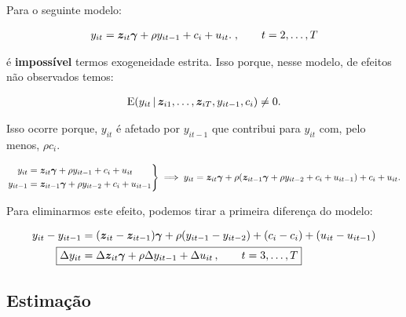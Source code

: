 \documentclass[11pt, oneside, a4paper, article]{article}
\numberwithin{equation}{section}
\begin{document}
\begin{description}
	Para o seguinte modelo:

	\vspace{-1.5 em}
	\begin{align*}
		y_{it} = \boldsymbol{z}_{it} \boldsymbol{\gamma} + \rho y_{i t - 1} + c_{i} + u_{it}.
		\; , \qquad t = 2, \dots, T
	\end{align*}

	\noindent
	é \textbf{impossível} termos exogeneidade estrita.
	Isso porque, nesse modelo, de efeitos não observados temos:

	\vspace{-1.5 em}
	\begin{align*}
		\text{E}( y_{it} \, | \, \boldsymbol{z}_{i1}, \dots, \boldsymbol{z}_{iT}, y_{it-1}, c_{i}) \neq 0.
	\end{align*}

	\noindent
	Isso ocorre porque, $y_{it}$ é afetado por $y_{it-1}$ que contribui para $y_{it}$ com, pelo menos, $\rho c_{i}$.

	\begin{equation*}
		\left.
			\begin{aligned}
				y_{it} &= \boldsymbol{z}_{it} \boldsymbol{\gamma} + \rho y_{i t - 1} + c_{i} + u_{it}
				\\
				y_{it-1} &= \boldsymbol{z}_{it-1} \boldsymbol{\gamma} + \rho y_{i t - 2} + c_{i} + u_{it-1}
			\end{aligned}
		\right\} 
		\implies
		y_{it} = \boldsymbol{z}_{it} \boldsymbol{\gamma} +
		\rho (\boldsymbol{z}_{it-1} \boldsymbol{\gamma} + \rho y_{i t - 2} + c_{i} + u_{it-1})
		+ c_{i} + u_{it}.
	\end{equation*}

	Para eliminarmos este efeito, podemos tirar a primeira diferença do modelo:

	\vspace{-1 em}
	\begin{align}
		\nonumber
		y_{it} - y_{it-1} &= 
		(\mbs{z}_{it} - \mbs{z}_{it-1}) \mbs{\gamma} +
		\rho (y_{i t - 1} -  y_{i t - 2} ) +
		(c_{i} - c_{i}) + (u_{it} - u_{it-1})
		\\
		\label{mod1:FDIV}
		\Aboxed{
			\Delta y_{it} &= 
			\Delta \mbs{z}_{it} \mbs{\gamma} + \rho \Delta y_{i t - 1} + \Delta u_{it}
		\, , \qquad t=3, \dots, T}
	\end{align}

	\subsection{Estimação}


\end{description}
\end{document}

